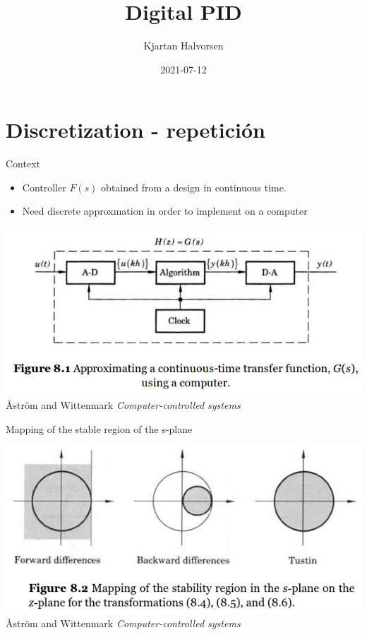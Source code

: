 \documentclass[presentation,aspectratio=1610]{beamer}
\author{Kjartan Halvorsen}
\date{2021-07-12}
\title{Digital PID}
\begin{document}
\maketitle


\section{Discretization - repetición}
\label{sec:orgdd9cf55}
\begin{frame}[label={sec:org41ab6a0}]{Context}
\begin{itemize}
\item Controller \(F(s)\) obtained from a design in continuous time.
\item Need discrete approxmation in order to implement on a computer
\end{itemize}

\begin{center}
 \includegraphics[width=0.7\linewidth]{../../figures/fig8-1.png}\\
   {\tiny Åström and Wittenmark \emph{Computer-controlled systems}}
\end{center}
\end{frame}

\begin{frame}[label={sec:org6622ef4}]{Mapping of the stable region of the s-plane}
\begin{center}
 \includegraphics[width=0.79\linewidth]{../../figures/fig8-2.png}\\
{\tiny Åström and Wittenmark \emph{Computer-controlled systems}}
\end{center}
\end{frame}
\end{document}
